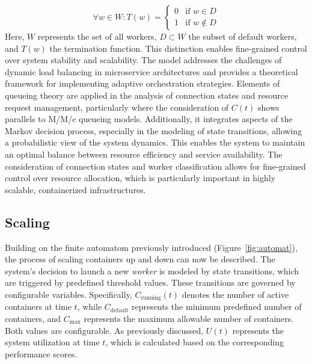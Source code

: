 \documentclass[twocolumn]{webofc}
\begin{document}
    $$ \forall w \in W: T(w) = \begin{cases}
                                   0 & \text{if } w \in D \\
                                   1 & \text{if } w \notin D
    \end{cases} $$
    Here, $W$ represents the set of all workers, $D \subset W$ the subset of default workers, and $T(w)$ the termination function. This distinction enables fine-grained control over system stability and scalability. The model addresses the challenges of dynamic load balancing in microservice architectures and provides a theoretical framework for implementing adaptive orchestration strategies. Elements of queueing theory are applied in the analysis of connection states and resource request management, particularly where the consideration of $C(t)$ shows parallels to M/M/c queueing models. Additionally, it integrates aspects of the Markov decision process, especially in the modeling of state transitions, allowing a probabilistic view of the system dynamics\cite{kendall1953stochastic}. This enables the system to maintain an optimal balance between resource efficiency and service availability. The consideration of connection states and worker classification allows for fine-grained control over resource allocation, which is particularly important in highly scalable, containerized infrastructures.

    \subsection{Scaling}
    Building on the finite automatom previously introduced (Figure~\ref{fig:automat}), the process of scaling containers up and down can now be described. The system’s decision to launch a new \textit{worker} is modeled by state transitions, which are triggered by predefined threshold values. These transitions are governed by configurable variables. Specifically, \( C_{\text{running}}(t) \) denotes the number of active containers at time \( t \), while \( C_{\text{default}} \) represents the minimum predefined number of containers, and \( C_{\text{max}} \) represents the maximum allowable number of containers. Both values are configurable. As previously discussed, \( U(t) \) represents the system utilization at time \( t \), which is calculated based on the corresponding performance scores.
\end{document}
